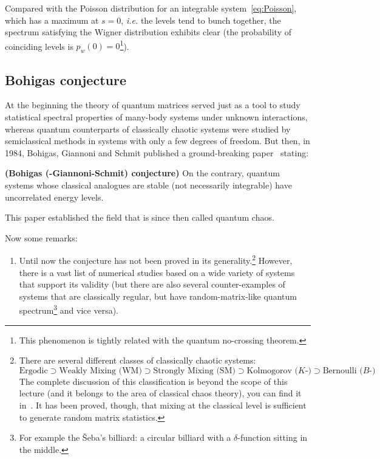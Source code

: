 \documentclass[a4paper,11pt,twoside]{article}
\begin{document}
        Compared with the Poisson distribution for an integrable system~\eqref{eq:Poisson}, which has a maximum at $s=0$, \emph{i.e.} the levels tend to bunch together, the spectrum satisfying the Wigner distribution exhibits clear  (the probability of coinciding levels is $p_{w}(0)=0$\footnote{This phenomenon is tightly related with the quantum no-crossing theorem.}). 

        \subsection{Bohigas conjecture}
        At the beginning the theory of quantum matrices served just as a tool to study statistical spectral properties of many-body systems under unknown interactions, whereas quantum counterparts of classically chaotic systems were studied by semiclassical methods in systems with only a few degrees of freedom.
        But then, in 1984, Bohigas, Giannoni and Schmit published a ground-breaking paper~\cite{Boh84} stating:
        \begin{theorem}
            {\bf (Bohigas (-Giannoni-Schmit) conjecture)}
            On the contrary, quantum systems whose classical analogues are stable (not necessarily integrable) have uncorrelated energy levels.
        \end{theorem}
        This paper established the field that is since then called quantum chaos.

        Now some remarks: 
        \begin{enumerate}
            \item Until now the conjecture has not been proved in its generality.\footnote{
                    There are several different classes of classically chaotic systems:
                    \begin{equation*}
                        \boxed{\text{Ergodic}}
                            \supset\boxed{\text{Weakly Mixing (WM)}}
                            \supset\boxed{\text{Strongly Mixing (SM)}}
                            \supset\boxed{\text{Kolmogorov ($K$-)}}
                            \supset\boxed{\text{Bernoulli ($B$-)}}
                    \end{equation*}
                    The complete discussion of this classification is beyond the scope of this lecture (and it belongs to the area of classical chaos theory), you can find it in~\cite{Sin77}.
                    It has been proved, though, that mixing at the classical level is sufficient to generate random matrix statistics.
                } 
                However, there is a vast list of numerical studies based on a wide variety of systems that support its validity (but there are also several counter-examples of systems that are classically regular, but have random-matrix-like quantum spectrum\footnote{For example the Šeba's billiard: a circular billiard with a $\delta$-function sitting in the middle.} and vice versa).
        \end{enumerate}
\end{document}
